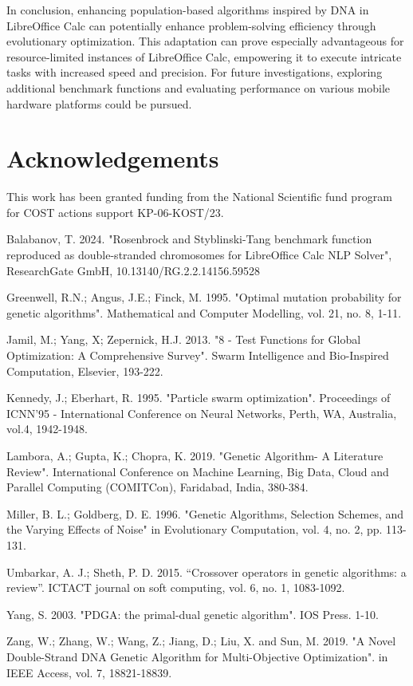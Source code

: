 \documentclass[runningheads]{llncs}
\begin{document}
In conclusion, enhancing population-based algorithms inspired by DNA in LibreOffice Calc can potentially enhance problem-solving efficiency through evolutionary optimization. This adaptation can prove especially advantageous for resource-limited instances of LibreOffice Calc, empowering it to execute intricate tasks with increased speed and precision. For future investigations, exploring additional benchmark functions and evaluating performance on various mobile hardware platforms could be pursued.

\section*{Acknowledgements} This work has been granted funding from the National Scientific fund program for COST actions support KP-06-KOST/23.

\begin{thebibliography}{8}

 Balabanov, T. 2024. "Rosenbrock and Styblinski-Tang benchmark function reproduced as double-stranded chromosomes for LibreOffice Calc NLP Solver", ResearchGate GmbH, 10.13140/RG.2.2.14156.59528

 Greenwell, R.N.; Angus, J.E.; Finck, M. 1995. "Optimal mutation probability for genetic algorithms". Mathematical and Computer Modelling, vol. 21, no. 8, 1-11.

 Jamil, M.; Yang, X; Zepernick, H.J. 2013. "8 - Test Functions for Global Optimization: A Comprehensive Survey". Swarm Intelligence and Bio-Inspired Computation, Elsevier, 193-222.

 Kennedy, J.; Eberhart, R. 1995. "Particle swarm optimization". Proceedings of ICNN'95 - International Conference on Neural Networks, Perth, WA, Australia, vol.4, 1942-1948.

 Lambora, A.; Gupta, K.; Chopra, K. 2019. "Genetic Algorithm- A Literature Review". International Conference on Machine Learning, Big Data, Cloud and Parallel Computing (COMITCon), Faridabad, India, 380-384.

 Miller, B. L.; Goldberg, D. E. 1996. "Genetic Algorithms, Selection Schemes, and the Varying Effects of Noise" in Evolutionary Computation, vol. 4, no. 2, pp. 113-131.

 Umbarkar, A. J.; Sheth, P. D. 2015. “Crossover operators in genetic algorithms: a review”. ICTACT journal on soft computing, vol. 6, no. 1, 1083-1092.

 Yang, S. 2003. "PDGA: the primal-dual genetic algorithm". IOS Press. 1-10.

 Zang, W.; Zhang, W.; Wang, Z.; Jiang, D.; Liu, X. and Sun, M. 2019. "A Novel Double-Strand DNA Genetic Algorithm for Multi-Objective Optimization". in IEEE Access, vol. 7, 18821-18839.

\end{thebibliography}
\end{document}
